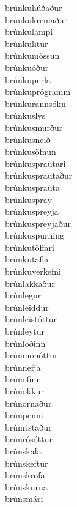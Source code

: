 \documentclass[../samsetningasafn.tex]{subfiles}
\begin{document}
\begin{bigwordlist}
\begin{footnotesize}
\begin{multicols}{4}
\begin{description}
		\item [brúnkuhúðaður]
		\item [brúnkukremaður]
		\item [brúnkulampi]
		\item [brúnkulitur]
		\item [brúnkumössun]
		\item [brúnkuóður]
		\item [brúnkuperla]
		\item [brúnkuprógramm]
		\item [brúnkurannsókn]
		\item [brúnkuslys]
		\item [brúnkusmurður]
		\item [brúnkusneið]
		\item [brúnkusöfnun]
		\item [brúnkusprautari]
		\item [brúnkusprautaður]
		\item [brúnkusprauta]
		\item [brúnkuspray]
		\item [brúnkuspreyja]
		\item [brúnkuspreyjaður]
		\item [brúnkuspurning]
		\item [brúnkutöffari]
		\item [brúnkutafla]
		\item [brúnkuverkefni]
		\item [brúnlakkaður]
		\item [brúnlegur]
		\item [brúnleiddur]
		\item [brúnleistóttur]
		\item [brúnleytur]
		\item [brúnloðinn]
		\item [brúnmönóttur]
		\item [brúnnefja]
		\item [brúnofinn]
		\item [brúnokkur]
		\item [brúnornaður]
		\item [brúnpenni]
		\item [brúnristaður]
		\item [brúnrósóttur]
		\item [brúnskala]
		\item [brúnskeftur]
		\item [brúnskrofa]
		\item [brúnskurna]
		\item [brúnsmári]

\end{description}
\end{multicols}
\end{footnotesize}
\end{bigwordlist}
\end{document}
